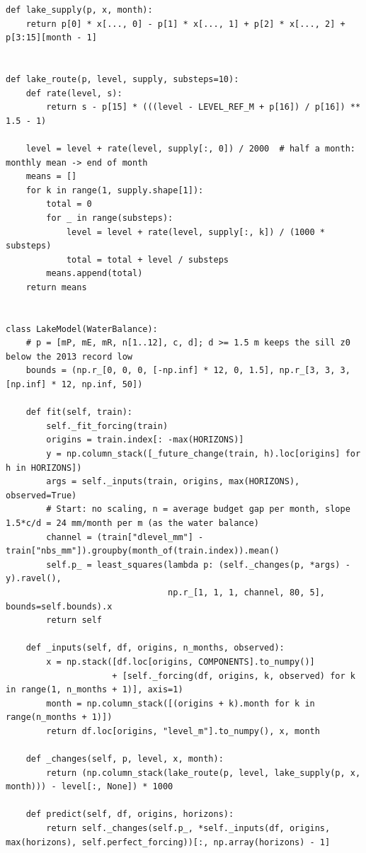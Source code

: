 \documentclass{article}
\begin{document}
\begin{lstlisting}[caption={Lake model}]
def lake_supply(p, x, month):
    return p[0] * x[..., 0] - p[1] * x[..., 1] + p[2] * x[..., 2] + p[3:15][month - 1]


def lake_route(p, level, supply, substeps=10):
    def rate(level, s):
        return s - p[15] * (((level - LEVEL_REF_M + p[16]) / p[16]) ** 1.5 - 1)

    level = level + rate(level, supply[:, 0]) / 2000  # half a month: monthly mean -> end of month
    means = []
    for k in range(1, supply.shape[1]):
        total = 0
        for _ in range(substeps):
            level = level + rate(level, supply[:, k]) / (1000 * substeps)
            total = total + level / substeps
        means.append(total)
    return means


class LakeModel(WaterBalance):
    # p = [mP, mE, mR, n[1..12], c, d]; d >= 1.5 m keeps the sill z0 below the 2013 record low
    bounds = (np.r_[0, 0, 0, [-np.inf] * 12, 0, 1.5], np.r_[3, 3, 3, [np.inf] * 12, np.inf, 50])

    def fit(self, train):
        self._fit_forcing(train)
        origins = train.index[: -max(HORIZONS)]
        y = np.column_stack([_future_change(train, h).loc[origins] for h in HORIZONS])
        args = self._inputs(train, origins, max(HORIZONS), observed=True)
        # Start: no scaling, n = average budget gap per month, slope 1.5*c/d = 24 mm/month per m (as the water balance)
        channel = (train["dlevel_mm"] - train["nbs_mm"]).groupby(month_of(train.index)).mean()
        self.p_ = least_squares(lambda p: (self._changes(p, *args) - y).ravel(),
                                np.r_[1, 1, 1, channel, 80, 5], bounds=self.bounds).x
        return self

    def _inputs(self, df, origins, n_months, observed):
        x = np.stack([df.loc[origins, COMPONENTS].to_numpy()]
                     + [self._forcing(df, origins, k, observed) for k in range(1, n_months + 1)], axis=1)
        month = np.column_stack([(origins + k).month for k in range(n_months + 1)])
        return df.loc[origins, "level_m"].to_numpy(), x, month

    def _changes(self, p, level, x, month):
        return (np.column_stack(lake_route(p, level, lake_supply(p, x, month))) - level[:, None]) * 1000

    def predict(self, df, origins, horizons):
        return self._changes(self.p_, *self._inputs(df, origins, max(horizons), self.perfect_forcing))[:, np.array(horizons) - 1]
\end{lstlisting}
\end{document}
